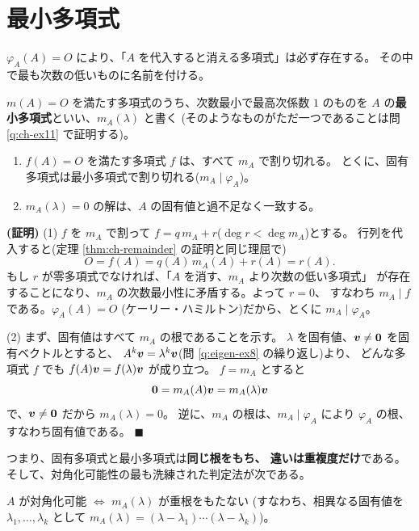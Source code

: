 \section{最小多項式}

$\varphi_A(A) = O$ により、「$A$ を代入すると消える多項式」は必ず存在する。
その中で最も次数の低いものに名前を付ける。

\begin{teigi}[最小多項式]
$m(A) = O$ を満たす多項式のうち、次数最小で最高次係数 $1$ のものを
$A$ の\textbf{最小多項式}といい、$m_A(\lambda)$ と書く
(そのようなものがただ一つであることは問 \ref{q:ch-ex11} で証明する)。
\end{teigi}

\begin{teiri}[最小多項式の基本性質]\label{thm:minpoly-basic}
\begin{enumerate}
\item $f(A) = O$ を満たす多項式 $f$ は、すべて $m_A$ で割り切れる。
とくに、固有多項式は最小多項式で割り切れる($m_A \mid \varphi_A$)。
\item $m_A(\lambda) = 0$ の解は、$A$ の固有値と過不足なく一致する。
\end{enumerate}
\end{teiri}

\noindent\textbf{(証明)}\quad
(1) $f$ を $m_A$ で割って $f = q\,m_A + r$($\deg r < \deg m_A$)とする。
行列を代入すると(定理 \ref{thm:ch-remainder} の証明と同じ理屈で)
\[
O = f(A) = q(A)\,m_A(A) + r(A) = r(A).
\]
もし $r$ が零多項式でなければ、「$A$ を消す、$m_A$ より次数の低い多項式」
が存在することになり、$m_A$ の次数最小性に矛盾する。よって $r = 0$、
すなわち $m_A \mid f$ である。$\varphi_A(A) = O$
(ケーリー・ハミルトン)だから、とくに $m_A \mid \varphi_A$。

(2) まず、固有値はすべて $m_A$ の根であることを示す。
$\lambda$ を固有値、$\bm{v} \neq \bm{0}$ を固有ベクトルとすると、
$A^k\bm{v} = \lambda^k\bm{v}$(問 \ref{q:eigen-ex8} の繰り返し)より、
どんな多項式 $f$ でも $f(A)\bm{v} = f(\lambda)\bm{v}$ が成り立つ。
$f = m_A$ とすると
\[
\bm{0} = m_A(A)\bm{v} = m_A(\lambda)\bm{v}
\]
で、$\bm{v} \neq \bm{0}$ だから $m_A(\lambda) = 0$。
逆に、$m_A$ の根は、$m_A \mid \varphi_A$ により $\varphi_A$ の根、
すなわち固有値である。 $\blacksquare$

つまり、固有多項式と最小多項式は\textbf{同じ根をもち、
違いは重複度だけ}である。
そして、対角化可能性の最も洗練された判定法が次である。

\begin{teiri}[最小多項式による判定]\label{thm:minpoly-diag}
$A$ が対角化可能 $\iff$ $m_A(\lambda)$ が重根をもたない
(すなわち、相異なる固有値を $\lambda_1, \dots, \lambda_k$ として
$m_A(\lambda) = (\lambda - \lambda_1)\cdots(\lambda - \lambda_k)$)。
\end{teiri}

